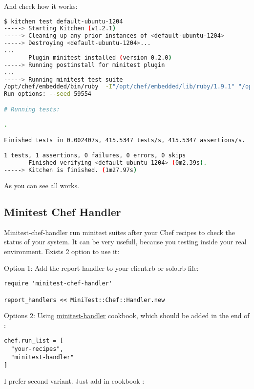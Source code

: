 And check how it works:

\begin{lstlisting}[language=Bash,label=lst:testing-minitest2]
$ kitchen test default-ubuntu-1204
-----> Starting Kitchen (v1.2.1)
-----> Cleaning up any prior instances of <default-ubuntu-1204>
-----> Destroying <default-ubuntu-1204>...
...
       Plugin minitest installed (version 0.2.0)
-----> Running postinstall for minitest plugin
...
-----> Running minitest test suite
/opt/chef/embedded/bin/ruby  -I"/opt/chef/embedded/lib/ruby/1.9.1" "/opt/chef/embedded/lib/ruby/1.9.1/rake/rake_test_loader.rb" "/tmp/busser/suites/minitest/test_default.rb"
Run options: --seed 59554

# Running tests:

.

Finished tests in 0.002407s, 415.5347 tests/s, 415.5347 assertions/s.

1 tests, 1 assertions, 0 failures, 0 errors, 0 skips
       Finished verifying <default-ubuntu-1204> (0m2.39s).
-----> Kitchen is finished. (1m27.97s)
\end{lstlisting}

As you can see all works.

\subsection{Minitest Chef Handler}

Minitest-chef-handler run minitest suites after your Chef recipes to check the status of your system. It can be very usefull, because you testing inside your real environment. Exists 2 option to use it:

Option 1: Add the report handler to your client.rb or solo.rb file:

\begin{lstlisting}[label=lst:testing-minitest3]
require 'minitest-chef-handler'

report_handlers << MiniTest::Chef::Handler.new
\end{lstlisting}

Options 2: Using \href{https://github.com/btm/minitest-handler-cookbook}{minitest-handler} cookbook, which should be added in the end of :

\begin{lstlisting}[label=lst:testing-minitest4]
chef.run_list = [
  "your-recipes",
  "minitest-handler"
]
\end{lstlisting}

I prefer second variant. Just add in  cookbook :

